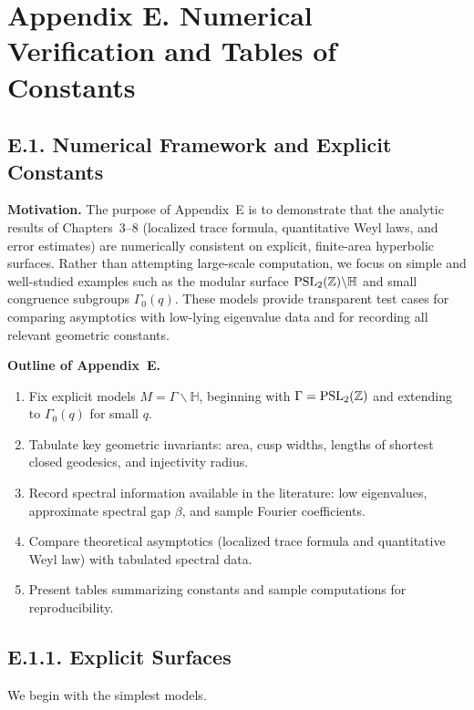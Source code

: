 \section{Appendix E. Numerical Verification and Tables of Constants}

\subsection*{E.1. Numerical Framework and Explicit Constants}

\noindent \textbf{Motivation.}
The purpose of Appendix~E is to demonstrate that the analytic results of 
Chapters~3--8 (localized trace formula, quantitative Weyl laws, and error estimates) 
are numerically consistent on explicit, finite-area hyperbolic surfaces. 
Rather than attempting large-scale computation, we focus on simple and well-studied 
examples such as the modular surface $\operatorname{PSL}_2(\mathbb Z)\backslash\mathbb H$ and 
small congruence subgroups $\Gamma_0(q)$. 
These models provide transparent test cases for comparing asymptotics with 
low-lying eigenvalue data and for recording all relevant geometric constants.  

\medskip
\noindent \textbf{Outline of Appendix~E.}
\begin{enumerate}
  \item Fix explicit models $M=\Gamma\backslash \mathbb H$, beginning with $\Gamma=\operatorname{PSL}_2(\mathbb Z)$ and extending to $\Gamma_0(q)$ for small $q$.
  \item Tabulate key geometric invariants: area, cusp widths, lengths of shortest closed geodesics, and injectivity radius.
  \item Record spectral information available in the literature: low eigenvalues, approximate spectral gap $\beta$, and sample Fourier coefficients.
  \item Compare theoretical asymptotics (localized trace formula and quantitative Weyl law) with tabulated spectral data.
  \item Present tables summarizing constants and sample computations for reproducibility.
\end{enumerate}

\medskip
\subsection*{E.1.1. Explicit Surfaces}

We begin with the simplest models.

